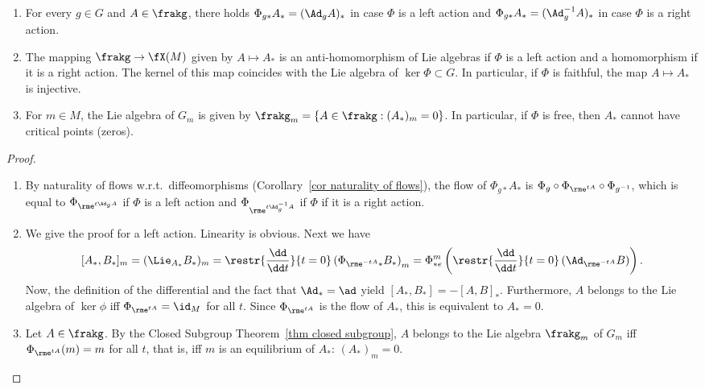 \begin{prop}[{{\cite[Prop.~6.2.2]{RS1}}}]\label{prop 6.2.2 RS1}
    \begin{enumerate}
        \item For every $g\in G$ and $A\in\frakg$, there holds $\Phi_{g\ast}A_\ast=(\Ad_g A)_\ast$ in case $\Phi$ is a left action and $\Phi_{g\ast}A_\ast=(\Ad_g^{-1} A)_\ast$ in case $\Phi$ is a right action.
        \item The mapping $\frakg\to \fX(M)$ given by $A\mapsto A_\ast$ is an anti-homomorphism of Lie algebras if $\Phi$ is a left action and a homomorphism if it is a right action. The kernel of this map coincides with the Lie algebra of $\ker\Phi\subset G$. In particular, if $\Phi$ is faithful, the map $A\mapsto A_\ast$ is injective.
        \item For $m\in M$, the Lie algebra of $G_m$ is given by $\frakg_m=\{A\in\frakg:(A_\ast)_m=0\}$. In particular, if $\Phi$ is free, then $A_\ast$ cannot have critical points (zeros).
    \end{enumerate}
\end{prop}
\begin{proof}
    \begin{enumerate}
        \item By naturality of flows w.r.t.\ diffeomorphisms (Corollary~\ref{cor naturality of flows}), the flow of $\Phi_{g\ast}A_\ast$ is $\Phi_g\circ \Phi_{\rme^{tA}}\circ \Phi_{g^{-1}}$, which is equal to $\Phi_{\rme^{t\Ad_g A}}$ if $\Phi$ is a left action and $\Phi_{\rme^{t\Ad_g^{-1} A}}$ if $\Phi$ if it is a right action.
        \item We give the proof for a left action. Linearity is obvious. Next we have
        \[[A_\ast,B_\ast]_m=(\Lie_{A_\ast}B_\ast)_m=\restr{\frac{\dd}{\dd t}}{t=0}\left(\Phi_{\rme^{-tA}\ast}B_\ast\right)_m=\Phi^m_{\ast e}\left(\restr{\frac{\dd}{\dd t}}{t=0}\left(\Ad_{\rme^{-tA}}B\right)\right).\]
        Now, the definition of the differential and the fact that $\Ad_\ast=\ad$ yield $[A_\ast,B_\ast]=-[A,B]_\ast$. Furthermore, $A$ belongs to the Lie algebra of $\ker\phi$ iff $\Phi_{\rme^{tA}}=\id_M$ for all $t$. Since $\Phi_{\rme^{tA}}$ is the flow of $A_\ast$, this is equivalent to $A_\ast=0$.
        \item Let $A\in\frakg$. By the Closed Subgroup Theorem~\ref{thm closed subgroup}, $A$ belongs to the Lie algebra $\frakg_m$ of $G_m$ iff $\Phi_{\rme^{tA}}(m)=m$ for all $t$, that is, iff $m$ is an equilibrium of $A_\ast$: $(A_{\ast})_{m}=0$.
 \end{enumerate}
\end{proof}

